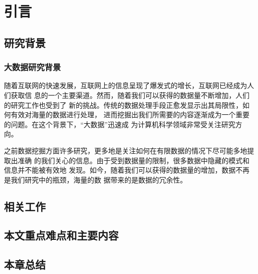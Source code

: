 
\chapter{引言}
\label{chap:intro}

\section{研究背景}
\label{sec:background}
\subsection{大数据研究背景}
随着互联网的快速发展，互联网上的信息呈现了爆发式的增长，互联网已经成为人们获取信
息的一个主要渠道。然而，随着我们可以获得的数据量不断增加，人们的研究工作也受到了
新的挑战。传统的数据处理手段正愈发显示出其局限性，如何有效对海量的数据进行处理，
进而挖掘出我们所需要的内容逐渐成为一个重要的问题。在这个背景下，“大数据”迅速成
为计算机科学领域非常受关注研究方向。

之前数据挖掘方面许多研究，更多地是关注如何在有限数据的情况下尽可能多地提取出准确
的我们关心的信息。由于受到数据量的限制，很多数据中隐藏的模式和信息并不能被有效地
发现。如今，随着我们可以获得的数据量的增加，数据不再是我们研究中的瓶颈，海量的数
据带来的是数据的冗余性。
\section{相关工作}
\label{sec:relatedwork}

\section{本文重点难点和主要内容}
\label{sec:mainwork}

\section{本章总结}
\label{sec:summaryintro}


